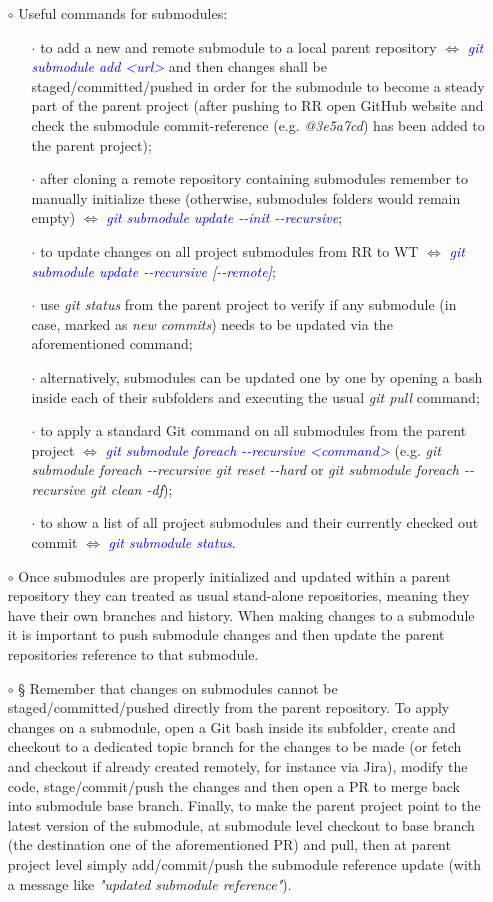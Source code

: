 \documentclass[a4paper,portrait,10pt]{article}   %
\newcommand{\mydiv}{$\Leftrightarrow$ }   %
\newcommand{\mycmd}[1]{\textcolor{blue}{\textit{#1}}}   %
\newcommand{\myvspace}{\vspace{4mm}}   %
\begin{document}
\begin{itemize}
\item[$\circ$] Useful commands for submodules:
\begin{itemize}
  \item[$\cdot$] to add a new and remote submodule to a local parent repository \mydiv \mycmd{git submodule add <url>} and then changes shall be staged/committed/pushed in order for the submodule to become a steady part of the parent project (after pushing to RR open GitHub website and check the submodule commit-reference (e.g. \textit{@3e5a7cd}) has been added to the parent project);
  \item[$\cdot$] after cloning a remote repository containing submodules remember to manually initialize these (otherwise, submodules folders would remain empty) \mydiv \mycmd{git submodule update -{}-init -{}-recursive};
  \item[$\cdot$] to update changes on all project submodules from RR to WT \mydiv \mycmd{git submodule update -{}-recursive [-{}-remote]};
  \item[$\cdot$] use \textit{git status} from the parent project to verify if any submodule (in case, marked as \textit{new commits}) needs to be updated via the aforementioned command;
  \item[$\cdot$] alternatively, submodules can be updated one by one by opening a bash inside each of their subfolders and executing the usual \textit{git pull} command;
  \item[$\cdot$] to apply a standard Git command on all submodules from the parent project \mydiv \mycmd{git submodule foreach -{}-recursive <command>} (e.g. \textit{git submodule foreach -{}-recursive git reset -{}-hard} or \textit{git submodule foreach -{}-recursive git clean -df});
  \item[$\cdot$] to show a list of all project submodules and their currently checked out commit \mydiv \mycmd{git submodule status}.
\end{itemize}
\myvspace

\item[$\circ$] Once submodules are properly initialized and updated within a parent repository they can treated as usual stand-alone repositories, meaning they have their own branches and history. When making changes to a submodule it is important to push submodule changes and then update the parent repositories reference to that submodule.
\myvspace

\item[$\circ$] § Remember that changes on submodules cannot be staged/committed/pushed directly from the parent repository. To apply changes on a submodule, open a Git bash inside its subfolder, create and checkout to a dedicated topic branch for the changes to be made (or fetch and checkout if already created remotely, for instance via Jira), modify the code, stage/commit/push the changes and then open a PR to merge back into submodule base branch. Finally, to make the parent project point to the latest version of the submodule, at submodule level checkout to base branch (the destination one of the aforementioned PR) and pull, then at parent project level simply add/commit/push the submodule reference update (with a message like \textit{"updated submodule reference"}).
\myvspace


\end{itemize}
\end{document}
